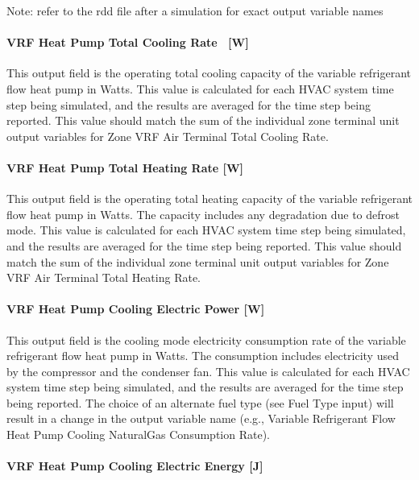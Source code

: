 Note: refer to the rdd file after a simulation for exact output variable names

\paragraph{VRF Heat Pump Total Cooling Rate ~{[}W{]}}\label{vrf-heat-pump-total-cooling-rate-w}

This output field is the operating total cooling capacity of the variable refrigerant flow heat pump in Watts. This value is calculated for each HVAC system time step being simulated, and the results are averaged for the time step being reported. This value should match the sum of the individual zone terminal unit output variables for Zone VRF Air Terminal Total Cooling Rate.

\paragraph{VRF Heat Pump Total Heating Rate {[}W{]}}\label{vrf-heat-pump-total-heating-rate-w}

This output field is the operating total heating capacity of the variable refrigerant flow heat pump in Watts. The capacity includes any degradation due to defrost mode. This value is calculated for each HVAC system time step being simulated, and the results are averaged for the time step being reported. This value should match the sum of the individual zone terminal unit output variables for Zone VRF Air Terminal Total Heating Rate.

\paragraph{VRF Heat Pump Cooling Electric Power {[}W{]}}\label{vrf-heat-pump-cooling-electric-power-w}

This output field is the cooling mode electricity consumption rate of the variable refrigerant flow heat pump in Watts. The consumption includes electricity used by the compressor and the condenser fan. This value is calculated for each HVAC system time step being simulated, and the results are averaged for the time step being reported. The choice of an alternate fuel type (see Fuel Type input) will result in a change in the output variable name (e.g., Variable Refrigerant Flow Heat Pump Cooling NaturalGas Consumption Rate).

\paragraph{VRF Heat Pump Cooling Electric Energy {[}J{]}}\label{vrf-heat-pump-cooling-electric-energy-j}

